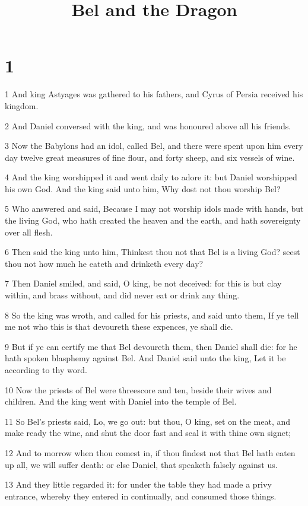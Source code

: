 

\title{Bel and the Dragon}

\chapter{1}

\par 1 And king Astyages was gathered to his fathers, and Cyrus of Persia received his kingdom.
\par 2 And Daniel conversed with the king, and was honoured above all his friends.
\par 3 Now the Babylons had an idol, called Bel, and there were spent upon him every day twelve great measures of fine flour, and forty sheep, and six vessels of wine.
\par 4 And the king worshipped it and went daily to adore it: but Daniel worshipped his own God. And the king said unto him, Why dost not thou worship Bel?
\par 5 Who answered and said, Because I may not worship idols made with hands, but the living God, who hath created the heaven and the earth, and hath sovereignty over all flesh.
\par 6 Then said the king unto him, Thinkest thou not that Bel is a living God? seest thou not how much he eateth and drinketh every day?
\par 7 Then Daniel smiled, and said, O king, be not deceived: for this is but clay within, and brass without, and did never eat or drink any thing.
\par 8 So the king was wroth, and called for his priests, and said unto them, If ye tell me not who this is that devoureth these expences, ye shall die.
\par 9 But if ye can certify me that Bel devoureth them, then Daniel shall die: for he hath spoken blasphemy against Bel. And Daniel said unto the king, Let it be according to thy word.
\par 10 Now the priests of Bel were threescore and ten, beside their wives and children. And the king went with Daniel into the temple of Bel.
\par 11 So Bel's priests said, Lo, we go out: but thou, O king, set on the meat, and make ready the wine, and shut the door fast and seal it with thine own signet;
\par 12 And to morrow when thou comest in, if thou findest not that Bel hath eaten up all, we will suffer death: or else Daniel, that speaketh falsely against us.
\par 13 And they little regarded it: for under the table they had made a privy entrance, whereby they entered in continually, and consumed those things.
